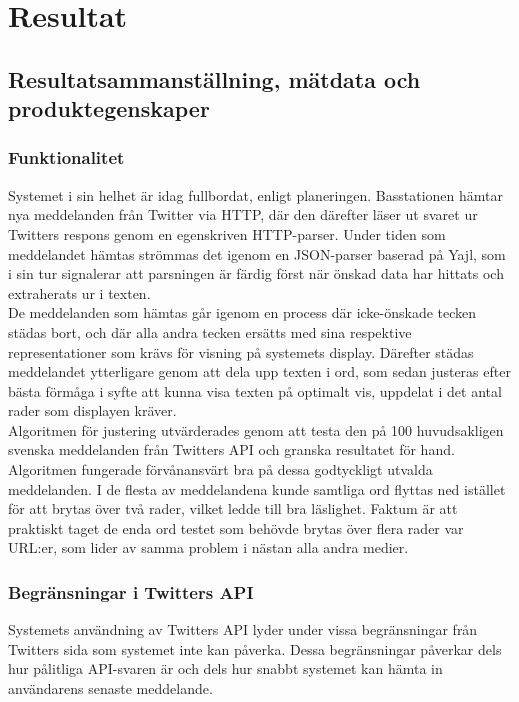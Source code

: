 \documentclass[a4paper,11pt]{article}
\begin{document}
\section{Resultat}

\subsection{Resultatsammanställning, mätdata och produktegenskaper}

\subsubsection{Funktionalitet}

Systemet i sin helhet är idag fullbordat, enligt planeringen. Basstationen hämtar nya meddelanden från Twitter via HTTP, där den därefter läser ut svaret ur Twitters respons genom en egenskriven HTTP-parser. Under tiden som meddelandet hämtas strömmas det igenom en JSON-parser baserad på Yajl, som i sin tur signalerar att parsningen är färdig först när önskad data har hittats och extraherats ur i texten.\\

De meddelanden som hämtas går igenom en process där icke-önskade tecken städas bort, och där alla andra tecken ersätts med sina respektive representationer som krävs för visning på systemets display. Därefter städas meddelandet ytterligare genom att dela upp texten i ord, som sedan justeras efter bästa förmåga i syfte att kunna visa texten på optimalt vis, uppdelat i det antal rader som displayen kräver.\\

Algoritmen för justering utvärderades genom att testa den på 100 huvudsakligen svenska meddelanden från Twitters API och granska resultatet för hand. Algoritmen fungerade förvånansvärt bra på dessa godtyckligt utvalda meddelanden. I de flesta av meddelandena kunde samtliga ord flyttas ned istället för att brytas över två rader, vilket ledde till bra läslighet. Faktum är att praktiskt taget de enda ord testet som behövde brytas över flera rader var URL:er, som lider av samma problem i nästan alla andra medier.

\subsubsection{Begränsningar i Twitters API}

Systemets användning av Twitters API lyder under vissa begränsningar från Twitters sida som systemet inte kan påverka. Dessa begränsningar påverkar dels hur pålitliga API-svaren är och dels hur snabbt systemet kan hämta in användarens senaste meddelande.\\
\end{document}
